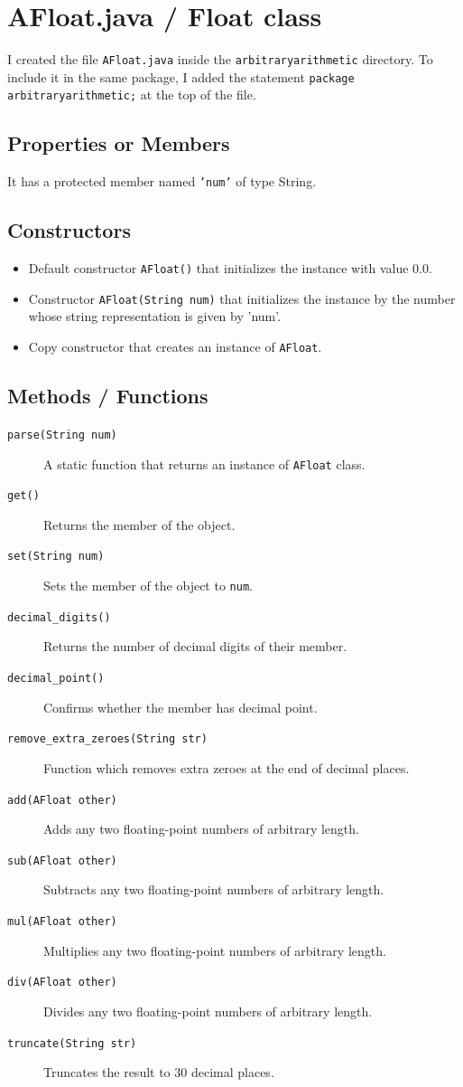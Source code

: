 \documentclass{article}
\begin{document}
\section*{AFloat.java / Float class}
I created the file \texttt{AFloat.java} inside the \texttt{arbitraryarithmetic} directory. To include it in the same package, I added the statement \texttt{package arbitraryarithmetic;} at the top of the file.

\subsection*{Properties or Members}
It has a protected member named \texttt{'num'} of type String.

\subsection*{Constructors}
\begin{itemize}
    \item Default constructor \texttt{AFloat()} that initializes the instance with value 0.0.
    \item Constructor \texttt{AFloat(String num)} that initializes the instance by the number whose string representation is given by 'num'.
    \item Copy constructor that creates an instance of \texttt{AFloat}.
\end{itemize}

\subsection*{Methods / Functions}
\begin{description}
    \item[\texttt{parse(String num)}] A static function that returns an instance of \texttt{AFloat} class.
    \item[\texttt{get()}] Returns the member of the object.
    \item[\texttt{set(String num)}] Sets the member of the object to \texttt{num}.
    \item[\texttt{decimal\_digits()}] Returns the number of decimal digits of their member.
    \item[\texttt{decimal\_point()}] Confirms whether the member has decimal point.
    \item[\texttt{remove\_extra\_zeroes(String str)}] Function which removes extra zeroes at the end of decimal places.
    \item[\texttt{add(AFloat other)}] Adds any two floating-point numbers of arbitrary length.
    \item[\texttt{sub(AFloat other)}] Subtracts any two floating-point numbers of arbitrary length.
    \item[\texttt{mul(AFloat other)}] Multiplies any two floating-point numbers of arbitrary length.
    \item[\texttt{div(AFloat other)}] Divides any two floating-point numbers of arbitrary length.
    \item[\texttt{truncate(String str)}] Truncates the result to 30 decimal places.
\end{description}
\end{document}
